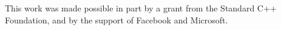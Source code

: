 \setcounter{chapter}{0}

This work was made possible in part by a grant from the Standard C++
Foundation, and by the support of Facebook and Microsoft.
